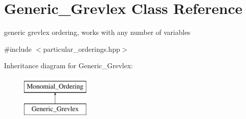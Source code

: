 \hypertarget{class_generic___grevlex}{}\section{Generic\+\_\+\+Grevlex Class Reference}
\label{class_generic___grevlex}


generic grevlex ordering, works with any number of variables  




{\ttfamily \#include $<$particular\+\_\+orderings.\+hpp$>$}

Inheritance diagram for Generic\+\_\+\+Grevlex\+:\begin{figure}[H]
\begin{center}
\leavevmode
\includegraphics[height=2.000000cm]{class_generic___grevlex}
\end{center}
\end{figure}
